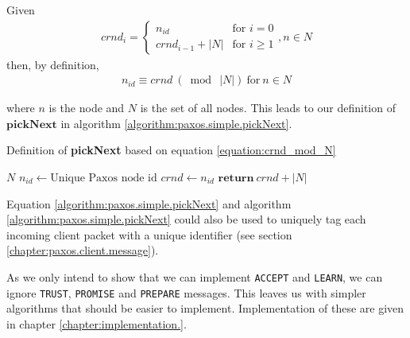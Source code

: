Given
\begin{gather}
  crnd_i = \left\{
             \begin{array}{ll}
               n_{id} & \mbox{for } i = 0 \\
               crnd_{i-1} + |N| & \mbox{for } i \geq 1
             \end{array}
           \right. , n \in N
  \label{equation:crnd_i}
\end{gather}
then, by definition,
\begin{gather}
  n_{id} \equiv crnd\ (\bmod\ |N|)\ \text{for}\ n \in N
  \label{equation:crnd_mod_N}
\end{gather}

where $n$ is the node and $N$ is the set of all nodes.  This leads to our
definition of $\textbf{pickNext}$ in algorithm
\ref{algorithm:paxos.simple.pickNext}.

\begin{algorithm}
  \caption{Definition of \textbf{pickNext} based on equation \ref{equation:crnd_mod_N}}
  \label{algorithm:paxos.simple.pickNext}
  \begin{algorithmic}
    \State $N$ 
    \State $n_{id} \gets \text{Unique Paxos node id}$
    \State $crnd \gets n_{id}$ 
    \State
      \State $\textbf{return}\ crnd + |N|$ 
    \EndFunction
  \end{algorithmic}
\end{algorithm}

Equation \ref{algorithm:paxos.simple.pickNext} and algorithm
\ref{algorithm:paxos.simple.pickNext} could also be used to uniquely tag
each incoming client packet with a unique identifier (see section
\ref{chapter:paxos.client.message}).

As we only intend to show that we can implement \texttt{ACCEPT} and
\texttt{LEARN}, we can ignore \texttt{TRUST}, \texttt{PROMISE} and
\texttt{PREPARE} messages.
%
This leaves us with simpler algorithms that should be easier to implement.
%
Implementation of these are given in chapter \ref{chapter:implementation.}.

